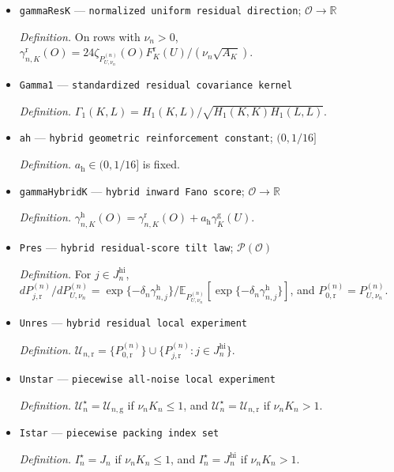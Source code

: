 \documentclass{article}
\begin{document}
\begin{itemize}
  \par\smallskip\noindent\emph{Definition.} \(F_K^{\mathrm r}(u)=\sum_{a\in\{1,K,K+1\}}w_{K,1}(a)B_1(au)\).
  \item \texttt{gammaResK} --- \texttt{normalized uniform residual direction}; \(\mathcal O\to\mathbb R\)
  \par\smallskip\noindent\emph{Definition.} On rows with \(\nu_n>0\), \(\gamma_{n,K}^{\mathrm r}(O)=24\zeta_{P_{U,\nu_n}^{(n)}}(O)F_K^{\mathrm r}(U)/(\nu_n\sqrt{A_K})\).
  \item \texttt{Gamma1} --- \texttt{standardized residual covariance kernel}
  \par\smallskip\noindent\emph{Definition.} \(\Gamma_1(K,L)=H_1(K,L)/\sqrt{H_1(K,K)H_1(L,L)}\).
  \item \texttt{ah} --- \texttt{hybrid geometric reinforcement constant}; \((0,1/16]\)
  \par\smallskip\noindent\emph{Definition.} \(a_{\mathrm h}\in(0,1/16]\) is fixed.
  \item \texttt{gammaHybridK} --- \texttt{hybrid inward Fano score}; \(\mathcal O\to\mathbb R\)
  \par\smallskip\noindent\emph{Definition.} \(\gamma_{n,K}^{\mathrm h}(O)=\gamma_{n,K}^{\mathrm r}(O)+a_{\mathrm h}\gamma_K^{\mathrm g}(U)\).
  \item \texttt{Pres} --- \texttt{hybrid residual-\allowbreak{}score tilt law}; \(\mathcal P(\mathcal O)\)
  \par\smallskip\noindent\emph{Definition.} For \(j\in J_n^{\mathrm{hi}}\), \(dP_{j,\mathrm r}^{(n)}/dP_{U,\nu_n}^{(n)}=\exp\{-\delta_n\gamma_{n,j}^{\mathrm h}\}/\mathbb E_{P_{U,\nu_n}^{(n)}}[\exp\{-\delta_n\gamma_{n,j}^{\mathrm h}\}]\), and \(P_{0,\mathrm r}^{(n)}=P_{U,\nu_n}^{(n)}\).
  \item \texttt{Unres} --- \texttt{hybrid residual local experiment}
  \par\smallskip\noindent\emph{Definition.} \(\mathcal U_{n,\mathrm r}=\{P_{0,\mathrm r}^{(n)}\}\cup\{P_{j,\mathrm r}^{(n)}:j\in J_n^{\mathrm{hi}}\}\).
  \item \texttt{Unstar} --- \texttt{piecewise all-\allowbreak{}noise local experiment}
  \par\smallskip\noindent\emph{Definition.} \(\mathcal U_n^\star=\mathcal U_{n,\mathrm g}\) if \(\nu_nK_n\leq1\), and \(\mathcal U_n^\star=\mathcal U_{n,\mathrm r}\) if \(\nu_nK_n>1\).
  \item \texttt{Istar} --- \texttt{piecewise packing index set}
  \par\smallskip\noindent\emph{Definition.} \(I_n^\star=J_n\) if \(\nu_nK_n\leq1\), and \(I_n^\star=J_n^{\mathrm{hi}}\) if \(\nu_nK_n>1\).
\end{itemize}
\end{document}
